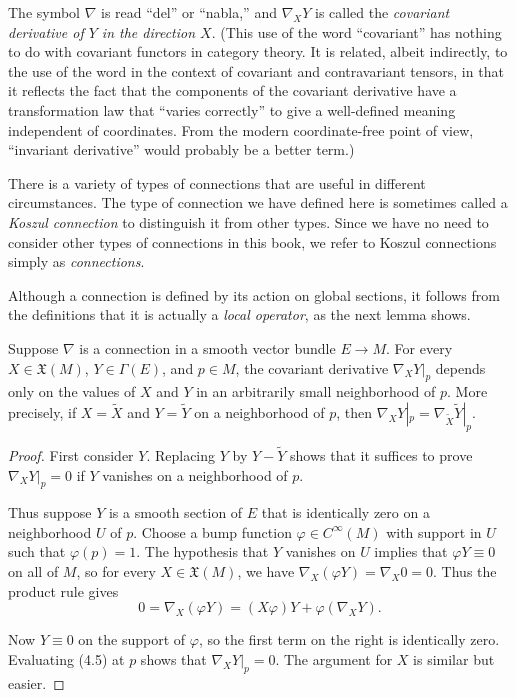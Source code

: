 The symbol $\nabla$ is read ``del'' or ``nabla,'' and $\nabla_X Y$ is called the \emph{covariant derivative of $Y$ in the direction $X$}. (This use of the word ``covariant'' has nothing to do with covariant functors in category theory. It is related, albeit indirectly, to the use of the word in the context of covariant and contravariant tensors, in that it reflects the fact that the components of the covariant derivative have a transformation law that ``varies correctly'' to give a well-defined meaning independent of coordinates. From the modern coordinate-free point of view, ``invariant derivative'' would probably be a better term.)

There is a variety of types of connections that are useful in different circumstances. The type of connection we have defined here is sometimes called a \emph{Koszul connection} to distinguish it from other types. Since we have no need to consider other types of connections in this book, we refer to Koszul connections simply as \emph{connections}.

Although a connection is defined by its action on global sections, it follows from the definitions that it is actually a \emph{local operator}, as the next lemma shows.

\begin{lemma}[Locality]
\label{lem:connection-is-local-operator}
Suppose $\nabla$ is a connection in a smooth vector bundle $E \to M$. For every $X \in \mathfrak{X}(M)$, $Y \in \Gamma(E)$, and $p \in M$, the covariant derivative $\nabla_X Y |_p$ depends only on the values of $X$ and $Y$ in an arbitrarily small neighborhood of $p$. More precisely, if $X = \tilde{X}$ and $Y = \tilde{Y}$ on a neighborhood of $p$, then $\nabla_X Y |_p = \nabla_{\tilde{X}} \tilde{Y} |_p$.
\end{lemma}

\begin{proof}
First consider $Y$. Replacing $Y$ by $Y - \tilde{Y}$ shows that it suffices to prove $\nabla_X Y |_p = 0$ if $Y$ vanishes on a neighborhood of $p$.

Thus suppose $Y$ is a smooth section of $E$ that is identically zero on a neighborhood $U$ of $p$. Choose a bump function $\varphi \in C^\infty(M)$ with support in $U$ such that $\varphi(p) = 1$. The hypothesis that $Y$ vanishes on $U$ implies that $\varphi Y \equiv 0$ on all of $M$, so for every $X \in \mathfrak{X}(M)$, we have $\nabla_X(\varphi Y) = \nabla_X 0 = 0$. Thus the product rule gives
\begin{equation}
0 = \nabla_X(\varphi Y) = (X\varphi)Y + \varphi(\nabla_X Y). \tag{4.5}
\end{equation}

Now $Y \equiv 0$ on the support of $\varphi$, so the first term on the right is identically zero. Evaluating (4.5) at $p$ shows that $\nabla_X Y|_p = 0$. The argument for $X$ is similar but easier.
\end{proof}

